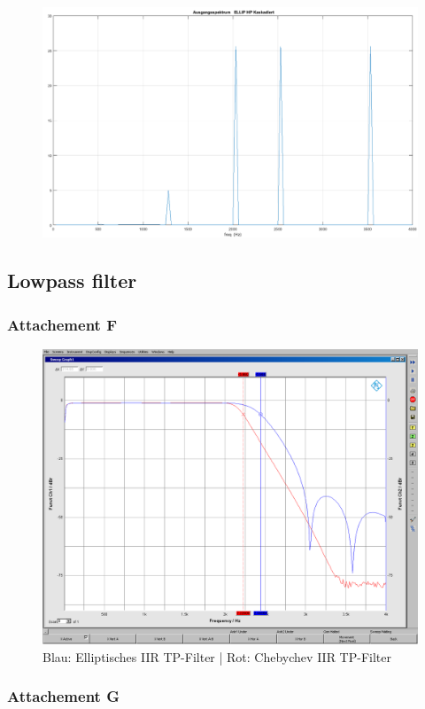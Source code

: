 \begin{figure}
\centering
\includegraphics[width=0.7\linewidth]{Bilder/Attachment_E_ELLIP_HP_Spektrum}
\caption{}
\label{fig:Attachment_E_ELLIP_HP_Spektrum}
\end{figure}



\subsection{Lowpass filter}
\subsubsection{Attachement F}

	\begin{figure}[h]
		\centering
		\includegraphics[width=0.8\linewidth]{Bilder/EllipCheby}
		\caption{Blau: Elliptisches IIR TP-Filter | Rot: Chebychev IIR TP-Filter}
		\label{fig:EllipCheby}
	\end{figure}

\subsubsection{Attachement G}

